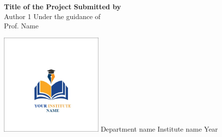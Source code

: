 \documentclass{article}
\begin{document}
	
	\begin{titlepage}
		\begin{center}
			\huge
			\textbf{Title of the Project}
			\vfill
			\Large
			\textbf{Submitted by}\\
			\medskip
			Author 1
			\vfill
			Under the guidance of\\
			\medskip
			Prof. Name
			\vfill
			
			\includegraphics[width=2in]{logo.jpg}
			\vfill
			Department name
			\vfill
			Institute name
			\vfill
			Year
		\end{center}
	\end{titlepage}
	\lipsum[1-10]
\end{document}
